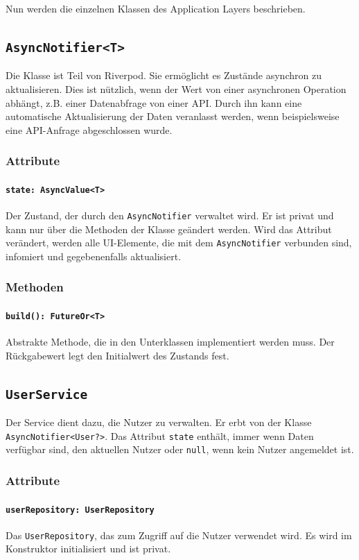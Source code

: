 \documentclass{entwurfsheft}
\begin{document}
Nun werden die einzelnen Klassen des Application Layers beschrieben.
\newpage
\subsection{\texttt{AsyncNotifier<T>}}
\label{sec:asyncNotifier}
Die Klasse ist Teil von Riverpod. Sie ermöglicht es Zustände asynchron zu aktualisieren. Dies ist nützlich, wenn der Wert von einer asynchronen Operation abhängt, z.B. einer Datenabfrage von einer API. Durch ihn kann eine automatische Aktualisierung der Daten veranlasst werden, wenn beispielsweise eine API-Anfrage abgeschlossen wurde.
\subsubsection*{Attribute}
\paragraph{\texttt{state: AsyncValue<T>}}
Der Zustand, der durch den \texttt{AsyncNotifier} verwaltet wird. Er ist privat und kann nur über die Methoden der Klasse geändert werden. Wird das Attribut verändert, werden alle UI-Elemente, die mit dem \texttt{AsyncNotifier} verbunden sind, infomiert und gegebenenfalls aktualisiert.
\subsubsection*{Methoden}
\paragraph{\texttt{build(): FutureOr<T>}}
Abstrakte Methode, die in den Unterklassen implementiert werden muss. Der Rückgabewert legt den Initialwert des Zustands fest.
\newpage
\subsection{\texttt{UserService}}\label{sec:userservice}
Der Service dient dazu, die Nutzer zu verwalten. Er erbt von der Klasse \texttt{AsyncNotifier<User?>}.  Das Attribut \texttt{state} enthält, immer wenn Daten verfügbar sind, den aktuellen Nutzer oder \texttt{null}, wenn kein Nutzer angemeldet ist.

\subsubsection*{Attribute}
\paragraph{\texttt{userRepository: UserRepository}}
Das \texttt{UserRepository}, das zum Zugriff auf die Nutzer verwendet wird. Es wird im Konstruktor initialisiert und ist privat.
\end{document}
